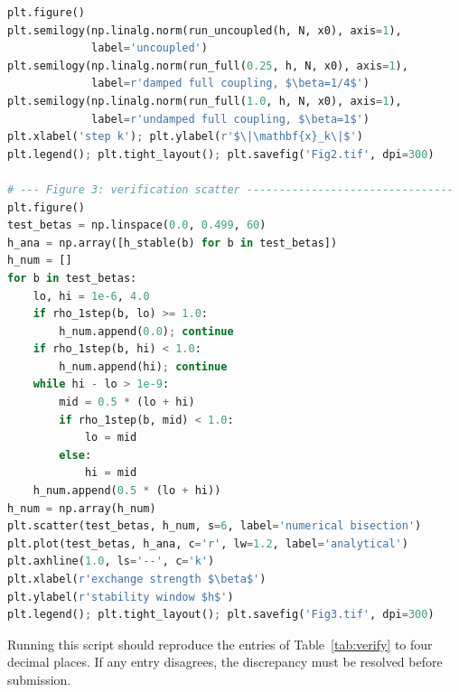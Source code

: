 \documentclass[12pt, a4paper]{article}
\theoremstyle{plain}
\theoremstyle{definition}
\theoremstyle{remark}
\begin{document}
\begin{lstlisting}[language=Python]
plt.figure()
plt.semilogy(np.linalg.norm(run_uncoupled(h, N, x0), axis=1),
             label='uncoupled')
plt.semilogy(np.linalg.norm(run_full(0.25, h, N, x0), axis=1),
             label=r'damped full coupling, $\beta=1/4$')
plt.semilogy(np.linalg.norm(run_full(1.0, h, N, x0), axis=1),
             label=r'undamped full coupling, $\beta=1$')
plt.xlabel('step k'); plt.ylabel(r'$\|\mathbf{x}_k\|$')
plt.legend(); plt.tight_layout(); plt.savefig('Fig2.tif', dpi=300)

# --- Figure 3: verification scatter --------------------------------
plt.figure()
test_betas = np.linspace(0.0, 0.499, 60)
h_ana = np.array([h_stable(b) for b in test_betas])
h_num = []
for b in test_betas:
    lo, hi = 1e-6, 4.0
    if rho_1step(b, lo) >= 1.0:
        h_num.append(0.0); continue
    if rho_1step(b, hi) < 1.0:
        h_num.append(hi); continue
    while hi - lo > 1e-9:
        mid = 0.5 * (lo + hi)
        if rho_1step(b, mid) < 1.0:
            lo = mid
        else:
            hi = mid
    h_num.append(0.5 * (lo + hi))
h_num = np.array(h_num)
plt.scatter(test_betas, h_num, s=6, label='numerical bisection')
plt.plot(test_betas, h_ana, c='r', lw=1.2, label='analytical')
plt.axhline(1.0, ls='--', c='k')
plt.xlabel(r'exchange strength $\beta$')
plt.ylabel(r'stability window $h$')
plt.legend(); plt.tight_layout(); plt.savefig('Fig3.tif', dpi=300)
\end{lstlisting}

\noindent
Running this script should reproduce the entries of
Table~\ref{tab:verify} to four decimal places. If any entry disagrees,
the discrepancy must be resolved before submission.
\end{document}
